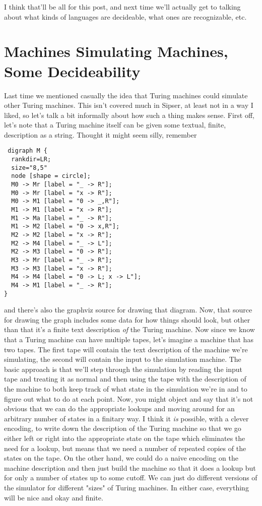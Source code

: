 \documentclass[11pt]{article}
\begin{document}
I think that'll be all for this post, and next time we'll actually get to talking about what kinds of languages are decideable, what ones are recognizable, etc.

\section{Machines Simulating Machines, Some Decideability}
\label{sec-12}
Last time we mentioned casually the idea that Turing machines could simulate other Turing machines. This isn't covered much in Sipser, at least not in a way I liked, so let's talk a bit informally about how such a thing makes sense. First off, let's note that a Turing machine itself can be given some textual, finite, description as a string. Thought it might seem silly, remember 

\begin{verbatim}
 digraph M {
  rankdir=LR;
  size="8,5"
  node [shape = circle];
  M0 -> Mr [label = "_ -> R"];
  M0 -> Mr [label = "x -> R"];
  M0 -> M1 [label = "0 -> _,R"];
  M1 -> M1 [label = "x -> R"];
  M1 -> Ma [label = "_ -> R"];
  M1 -> M2 [label = "0 -> x,R"];
  M2 -> M2 [label = "x -> R"];
  M2 -> M4 [label = "_ -> L"];
  M2 -> M3 [label = "0 -> R"];
  M3 -> Mr [label = "_ -> R"];
  M3 -> M3 [label = "x -> R"];
  M4 -> M4 [label = "0 -> L; x -> L"];
  M4 -> M1 [label = "_ -> R"];
}
\end{verbatim}
and there's also the graphviz source for drawing that diagram. Now, that source for drawing the graph includes some data for how things should look, but other than that it's a finite text description \emph{of} the Turing machine. Now since we know that a Turing machine can have multiple tapes, let's imagine a machine that has two tapes. The first tape will contain the text description of the machine we're simulating, the second will contain the input to the simulation machine. The basic approach is that we'll step through the simulation by reading the input tape and treating it as normal and then using the tape with the description of the machine to both keep track of what state in the simulation we're in and to figure out what to do at each point. Now, you might object and say that it's not obvious that we can do the appropriate lookups and moving around for an arbitrary number of states in a finitary way. I think it \emph{is} possible, with a clever encoding, to write down the description of the Turing machine so that we go either left or right into the appropriate state on the tape which eliminates the need for a lookup, but means that we need a number of repeated copies of the states on the tape. On the other hand, we could do a naive encoding on the machine description and then just build the machine so that it does a lookup but for only a number of states up to some cutoff. We can just do different versions of the simulator for different "sizes" of Turing machines. In either case, everything will be nice and okay and finite.
\end{document}
